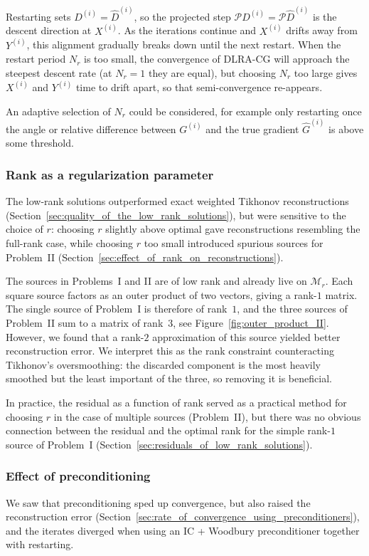 Restarting sets $D^{(i)} = \hat D^{(i)}$, so the projected step $\mathcal{P}D^{(i)} = \mathcal{P}\hat D^{(i)}$ is the descent direction at $X^{(i)}$. As the iterations continue and $X^{(i)}$ drifts away from $Y^{(i)}$, this alignment gradually breaks down until the next restart. When the restart period $N_r$ is too small, the convergence of DLRA-CG will approach the steepest descent rate (at $N_r = 1$ they are equal), but choosing $N_r$ too large gives $X^{(i)}$ and $Y^{(i)}$ time to drift apart, so that semi-convergence re-appears.

An adaptive selection of $N_r$ could be considered, for example only restarting once the angle or relative difference between $G^{(i)}$ and the true gradient $\hat G^{(i)}$ is above some threshold.


\subsubsection{Rank as a regularization parameter}\label{sec:rank_as_a_regularization_parameter}

The low-rank solutions outperformed exact weighted Tikhonov reconstructions (Section~\ref{sec:quality_of_the_low_rank_solutions}), but were sensitive to the choice of $r$: choosing $r$ slightly above optimal gave reconstructions resembling the full-rank case, while choosing $r$ too small introduced spurious sources for Problem~II
(Section~\ref{sec:effect_of_rank_on_reconstructions}).

The sources in Problems~I and II are of low rank and already live on $\mathcal{M}_r$. Each square source factors as an outer product of two vectors, giving a rank-$1$ matrix. The single source of Problem~I is therefore of rank~$1$, and the three sources of Problem~II sum to a matrix of rank~$3$, see Figure~\ref{fig:outer_product_II}. However, we found that a rank-$2$ approximation of this source yielded better reconstruction error. We interpret this as the rank constraint counteracting Tikhonov's oversmoothing: the discarded component is the most heavily smoothed but the least important of the three, so removing it is beneficial.

In practice, the residual as a function of rank served as a practical method for choosing $r$ in the case of multiple sources (Problem~II), but there was no obvious connection between the residual and the optimal rank for the simple rank-$1$ source of Problem~I (Section~\ref{sec:residuals_of_low_rank_solutions}).


\subsubsection{Effect of preconditioning}
We saw that preconditioning sped up convergence, but also raised the reconstruction error (Section~\ref{sec:rate_of_convergence_using_preconditioners}), and the iterates diverged when using an IC + Woodbury preconditioner together with restarting.

